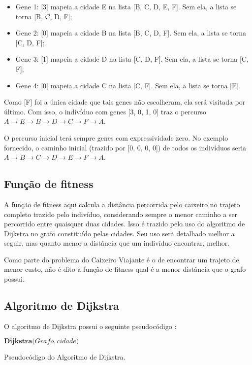 \begin{itemize}
	\item Gene 1: [3] mapeia a cidade E na lista [B, C, D, E, F]. Sem ela, a lista se torna [B, C, D, F];
	\item Gene 2: [0] mapeia a cidade B na lista [B, C, D, F]. Sem ela, a lista se torna [C, D, F];
	\item Gene 3: [1] mapeia a cidade D na lista [C, D, F]. Sem ela, a lista se torna [C, F];
	\item Gene 4: [0] mapeia a cidade C na lista [C, F]. Sem ela, a lista se torna [F].
\end{itemize}

Como [F] foi a única cidade que tais genes não escolheram, ela será visitada por último. Com isso, o indivíduo com genes [3, 0, 1, 0] traz o percurso $A \rightarrow E \rightarrow B \rightarrow D \rightarrow C \rightarrow F \rightarrow A$.

O percurso inicial terá sempre genes com expressividade zero. No exemplo fornecido, o caminho inicial (trazido por [0, 0, 0, 0]) de todos os indivíduos seria $A \rightarrow B \rightarrow C \rightarrow D \rightarrow E \rightarrow F \rightarrow A$.

\subsection*{Função de fitness}

A função de fitness aqui calcula a distância percorrida pelo caixeiro no trajeto completo trazido pelo indivíduo, considerando sempre o menor caminho a ser percorrido entre quaisquer duas cidades. Isso é trazido pelo uso do algoritmo de Dijkstra \cite{dijkstra1959note} no grafo constituído pelas cidades. Seu uso será detalhado melhor a seguir, mas quanto menor a distância que um indivíduo encontrar, melhor.

Como parte do problema do Caixeiro Viajante é o de encontrar um trajeto de menor custo, não é dito à função de fitness qual é a menor distância que o grafo possui.

\subsection*{Algoritmo de Dijkstra}

O algoritmo de Dijkstra possui o seguinte pseudocódigo \cite{cormen2001dijkstra}:

\begin{algorithm}[H]
$\textbf{Dijkstra(} Grafo, cidade \textbf{)}$
\caption{Pseudocódigo do Algoritmo de Dijkstra.}
\label{alg:dijkstra}
\end{algorithm}

